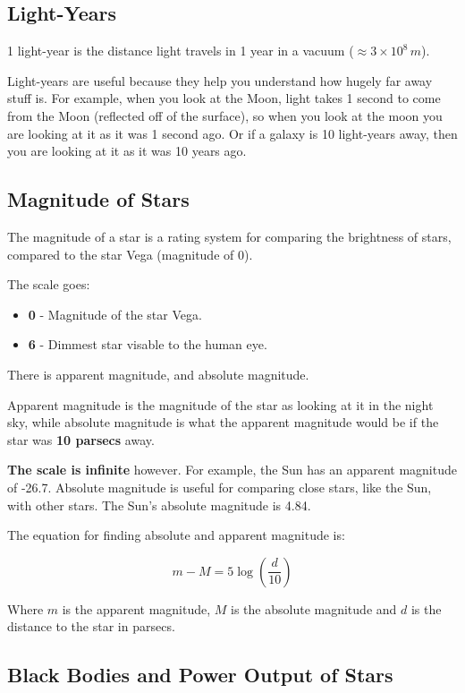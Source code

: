 \documentclass[a4paper, 12pt]{article}
\begin{document}
\subsection{Light-Years}

1 light-year is the distance light travels in 1 year in a vacuum ($\approx 3 \times 10^8 \, m$).

Light-years are useful because they help you understand how hugely far away stuff is. For example, when you look at the Moon, light takes 1 second to come from the Moon (reflected off of the surface), so when you look at the moon you are looking at it as it was 1 second ago. Or if a galaxy is 10 light-years away, then you are looking at it as it was 10 years ago.

\subsection{Magnitude of Stars}

The magnitude of a star is a rating system for comparing the brightness of stars, compared to the star Vega (magnitude of 0).

The scale goes:

\begin{itemize}
	\item \textbf{0} - Magnitude of the star Vega.
	\item \textbf{6} - Dimmest star visable to the human eye.
\end{itemize}

There is apparent magnitude, and absolute magnitude.

Apparent magnitude is the magnitude of the star as looking at it in the night sky, while absolute magnitude is what the apparent magnitude would be if the star was \textbf{10 parsecs} away.

\textbf{The scale is infinite} however. For example, the Sun has an apparent magnitude of -26.7. Absolute magnitude is useful for comparing close stars, like the Sun, with other stars. The Sun's absolute magnitude is 4.84.

The equation for finding absolute and apparent magnitude is:

$$
m - M = 5 \log \left({\frac{d}{10}}\right)
$$

Where $m$ is the apparent magnitude, $M$ is the absolute magnitude and $d$ is the distance to the star in parsecs.



\subsection{Black Bodies and Power Output of Stars}
\end{document}
